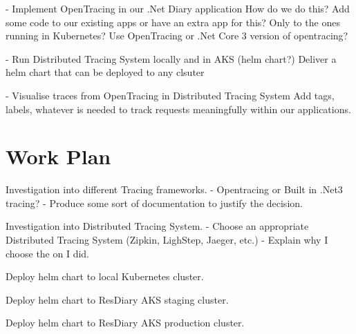 \documentclass[11pt]{article}
\begin{document}
- Implement OpenTracing in our .Net Diary application
    How do we do this?
    Add some code to our existing apps or have an extra app for this?
    Only to the ones running in Kubernetes?
    Use OpenTracing or .Net Core 3 version of opentracing?

- Run Distributed Tracing System locally and in AKS (helm chart?)
    Deliver a helm chart that can be deployed to any clsuter

- Visualise traces from OpenTracing in Distributed Tracing System
    Add tags, labels, whatever is needed to track requests meaningfully
    within our applications.

\section{Work Plan}


Investigation into different Tracing frameworks.
- Opentracing or Built in .Net3 tracing?
- Produce some sort of documentation to justify the decision.

Investigation into Distributed Tracing System.
- Choose an appropriate Distributed Tracing System (Zipkin, LighStep, Jaeger, etc.)
- Explain why I choose the on I did.

Deploy helm chart to local Kubernetes cluster.

Deploy helm chart to ResDiary AKS staging cluster.

Deploy helm chart to ResDiary AKS production cluster.




\end{document}
